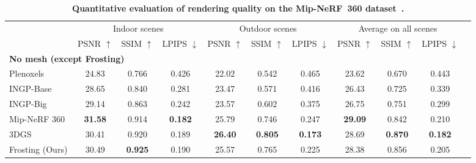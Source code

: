 \begin{table}
   \caption{\textbf{Quantitative evaluation of rendering quality on the Mip-NeRF~360 dataset~\cite{barron2022mipnerf360}.}  }
  \label{tab:nvsmetrics_mipnerf360}
  \centering
  {\scriptsize
  \begin{tabular}{@{}lcccccccccc@{}}
    \toprule
     \multicolumn{1}{c}{} & \multicolumn{3}{c}{Indoor scenes} & \multicolumn{3}{c}{Outdoor scenes} & \multicolumn{3}{c}{Average on all scenes} \\
     \cmidrule(r){2-4} \cmidrule(r){5-7} \cmidrule(r){8-10}
      & PSNR $\uparrow$ & SSIM $\uparrow$ & LPIPS $\downarrow$ & PSNR $\uparrow$ & SSIM $\uparrow$ & LPIPS $\downarrow$ & PSNR $\uparrow$ & SSIM $\uparrow$ & LPIPS $\downarrow$ \\
    \midrule
    \multicolumn{10}{l}{\textbf{No mesh (except Frosting)}} \\
    \midrule
    Plenoxels~\cite{yu_and_fridovichkeil2021plenoxels} & 24.83 & 0.766 & 0.426 & 22.02 & 0.542 & 0.465 & 23.62 & 0.670 & 0.443 \\
    INGP-Base~\cite{mueller2022instantngp} & 28.65 & 0.840 & 0.281 & 23.47 & 0.571 & 0.416 & 26.43 & 0.725 & 0.339 \\
    INGP-Big~\cite{mueller2022instantngp} & 29.14 & 0.863 & 0.242 & 23.57 & 0.602 & 0.375 & 26.75 & 0.751 & 0.299 \\
    Mip-NeRF 360~\cite{barron2022mipnerf360} & \cellcolor{red!25}\textbf{31.58} & \cellcolor{yellow!25}0.914 & \cellcolor{red!25}\textbf{0.182} & \cellcolor{orange!25}25.79 & \cellcolor{yellow!25}0.746 & \cellcolor{yellow!25}0.247 & \cellcolor{red!25}\textbf{29.09} & \cellcolor{yellow!25}0.842 & \cellcolor{yellow!25}0.210 \\
    3DGS~\cite{kerbl3Dgaussians} & \cellcolor{yellow!25}30.41 & \cellcolor{orange!25}0.920 & \cellcolor{orange!25}0.189 & \cellcolor{red!25}\textbf{26.40} & \cellcolor{red!25}\textbf{0.805} & \cellcolor{red!25}\textbf{0.173} & \cellcolor{orange!25}28.69 & \cellcolor{red!25}\textbf{0.870} & \cellcolor{red!25}\textbf{0.182} \\
    Frosting (Ours) & \cellcolor{orange!25}30.49 & \cellcolor{red!25}\textbf{0.925} & \cellcolor{yellow!25}0.190 & \cellcolor{yellow!25}25.57 & \cellcolor{orange!25}0.765 & \cellcolor{orange!25}0.225 & \cellcolor{yellow!25}28.38 & \cellcolor{orange!25}0.856 & \cellcolor{orange!25}0.205\\

\end{tabular}}
\end{table}
